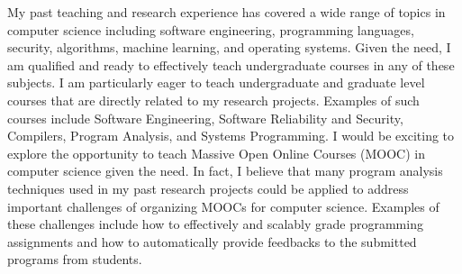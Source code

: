 \documentclass{NSF}
\begin{document}


My past teaching and research experience has covered a wide range of topics in
computer science including software engineering, programming languages, security, algorithms, machine
learning, and operating systems. Given the need, I am qualified and ready to effectively teach undergraduate courses in any of these subjects. I am particularly eager to teach undergraduate and graduate
level courses that are directly related to my research projects. Examples of such courses include Software
Engineering, Software Reliability and Security, Compilers, Program Analysis, and Systems Programming.
I would be exciting to explore the opportunity to teach Massive Open Online Courses (MOOC) in
computer science given the need. In fact, I believe that many program analysis techniques used in
my past research projects could be applied to address important challenges of organizing MOOCs for
computer science. Examples of these challenges include how to effectively and scalably grade programming
assignments and how to automatically provide feedbacks to the submitted programs from students.
\end{document}

